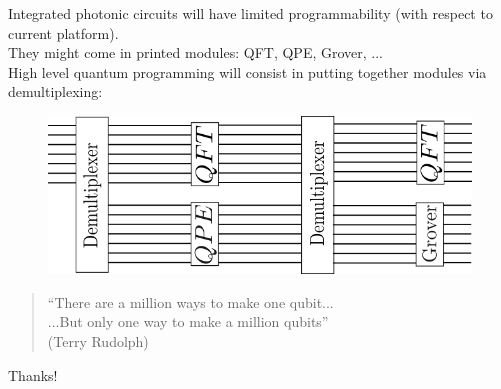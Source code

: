 \documentclass{beamer}
\begin{document}
\begin{frame}
\begin{center}
Integrated photonic circuits will have limited programmability (with respect to current platform).\\

They might come in printed modules: QFT, QPE, Grover, ...\\

High level quantum programming will consist in putting together modules via demultiplexing:

\begin{figure}[!htb]
\centering
\includegraphics[scale=.50]{immagini/modular.png}
\end{figure}

\end{center}
\end{frame}

\begin{frame}
\begin{center}

\begin{quote}
``There are a million ways to make one qubit...\\
...But only one way to make a million qubits''\\
\hfill (Terry Rudolph)
\end{quote}
\vspace{20pt}
\Huge{Thanks!}

\end{center}
\end{frame}
\end{document}
